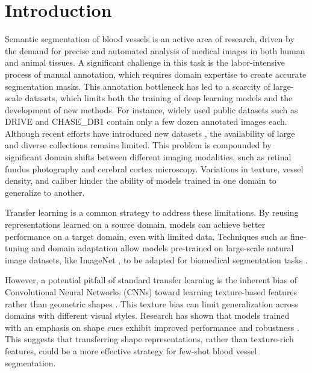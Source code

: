 \documentclass[%
reprint,
nofootinbib,
 amsmath,amssymb,
aps,
superscriptaddress,
showkeys,
longbibliography
]{revtex4-1}
\begin{document}

\maketitle
\thispagestyle{plain}

\section{Introduction}
\label{sec:introduction}

Semantic segmentation of blood vessels is an active area of research, driven by the demand for precise and automated analysis of medical images in both human and animal tissues. A significant challenge in this task is the labor-intensive process of manual annotation, which requires domain expertise to create accurate segmentation masks. This annotation bottleneck has led to a scarcity of large-scale datasets, which limits both the training of deep learning models and the development of new methods. For instance, widely used public datasets such as DRIVE \cite{Staal2004} and CHASE\_DB1 \cite{Fraz2012ensemble} contain only a few dozen annotated images each. Although recent efforts have introduced new datasets \cite{jin2022fives, fhima2024lunet}, the availability of large and diverse collections remains limited. This problem is compounded by significant domain shifts between different imaging modalities, such as retinal fundus photography and cerebral cortex microscopy. Variations in texture, vessel density, and caliber hinder the ability of models trained in one domain to generalize to another.

Transfer learning is a common strategy to address these limitations. By reusing representations learned on a source domain, models can achieve better performance on a target domain, even with limited data. Techniques such as fine-tuning and domain adaptation allow models pre-trained on large-scale natural image datasets, like ImageNet \cite{JiaDeng2009}, to be adapted for biomedical segmentation tasks \cite{zoetmulderDomainTaskspecificTransfer2022}.

However, a potential pitfall of standard transfer learning is the inherent bias of Convolutional Neural Networks (CNNs) toward learning texture-based features rather than geometric shapes \cite{geirhos2018, islam2021shape}. This texture bias can limit generalization across domains with different visual styles. Research has shown that models trained with an emphasis on shape cues exhibit improved performance and robustness \cite{geirhos2018}. This suggests that transferring shape representations, rather than texture-rich features, could be a more effective strategy for few-shot blood vessel segmentation.
\end{document}
